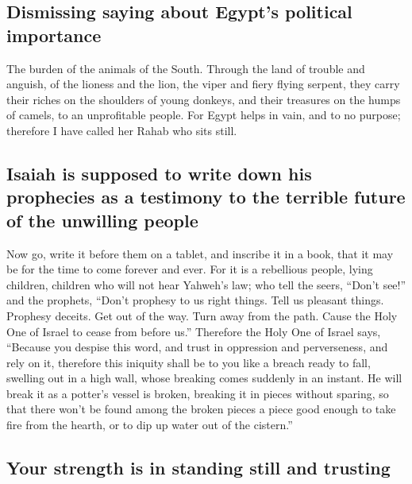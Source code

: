 \hypertarget{dismissing-saying-about-egypts-political-importance}{%
\subsection{Dismissing saying about Egypt's political
importance}\label{dismissing-saying-about-egypts-political-importance}}

 The burden of the animals of the South. Through the land
of trouble and anguish, of the lioness and the lion, the viper and fiery
flying serpent, they carry their riches on the shoulders of young
donkeys, and their treasures on the humps of camels, to an unprofitable
people.  For Egypt helps in vain, and to no purpose;
therefore I have called her Rahab who sits still.

\hypertarget{isaiah-is-supposed-to-write-down-his-prophecies-as-a-testimony-to-the-terrible-future-of-the-unwilling-people}{%
\subsection{Isaiah is supposed to write down his prophecies as a
testimony to the terrible future of the unwilling
people}\label{isaiah-is-supposed-to-write-down-his-prophecies-as-a-testimony-to-the-terrible-future-of-the-unwilling-people}}

 Now go, write it before them on a tablet, and inscribe it
in a book, that it may be for the time to come forever and ever.
 For it is a rebellious people, lying children, children
who will not hear Yahweh's law;  who tell the seers,
``Don't see!'' and the prophets, ``Don't prophesy to us right things.
Tell us pleasant things. Prophesy deceits.  Get out of
the way. Turn away from the path. Cause the Holy One of Israel to cease
from before us.''  Therefore the Holy One of Israel says,
``Because you despise this word, and trust in oppression and
perverseness, and rely on it,  therefore this iniquity
shall be to you like a breach ready to fall, swelling out in a high
wall, whose breaking comes suddenly in an instant.  He
will break it as a potter's vessel is broken, breaking it in pieces
without sparing, so that there won't be found among the broken pieces a
piece good enough to take fire from the hearth, or to dip up water out
of the cistern.''

\hypertarget{your-strength-is-in-standing-still-and-trusting}{%
\subsection{Your strength is in standing still and
trusting}\label{your-strength-is-in-standing-still-and-trusting}}

